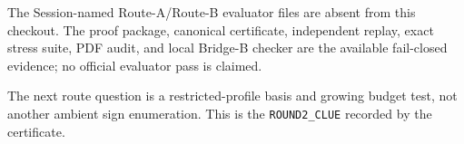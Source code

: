 \documentclass[10pt]{article}
\begin{document}
The Session-named Route-A/Route-B evaluator files are absent from this
checkout.  The proof package, canonical certificate, independent replay,
exact stress suite, PDF audit, and local Bridge-B checker are the available
fail-closed evidence; no official evaluator pass is claimed.

The next route question is a restricted-profile basis and growing budget
test, not another ambient sign enumeration.  This is the
\texttt{ROUND2\_CLUE} recorded by the certificate.



\end{document}
